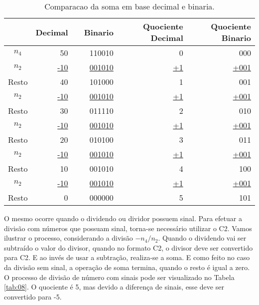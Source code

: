 \documentclass[12pt]{article}
\begin{document}
\begin{table}[ht]
	\centering
    \caption{Comparacao da soma em base decimal e binaria.}
    \begin{tabular}{crrrrr}
    \hline
    	  & Decimal & & Binario & Quociente Decimal & Quociente Binario \\
    \hline  
    $n_4$ & 50 					& & 110010
&0& 000 \\
    $n_2$ & \underline{-10} 	& & \underline{001010}  &\underline{+1}&
\underline{+001} \\
    Resto & 40      			& & 101000  			&1& 001
\\
    $n_2$ & \underline{-10} 	& & \underline{001010}  &\underline{+1}&
\underline{+001} \\
    Resto & 30      			& & 011110  			&2& 010
\\
    $n_2$ & \underline{-10} 	& & \underline{001010}  &\underline{+1}&
\underline{+001} \\
    Resto & 20      			& & 010100  			&3& 011
\\
    $n_2$ & \underline{-10} 	& & \underline{001010}  &\underline{+1}&
\underline{+001} \\
    Resto & 10      			& & 001010  			&4& 100
\\
    $n_2$ & \underline{-10} 	& & \underline{001010}  &\underline{+1}&
\underline{+001} \\
    Resto & 0      				& & 000000
&5& 101 \\
    \hline
	\end{tabular}
    \label{tab:07}
\end{table}

O mesmo ocorre quando o dividendo ou dividor possuem sinal. Para efetuar a
divisão com números que possuam sinal, torna-se necessário utilizar o C2. Vamos
ilustrar o processo, considerando a divisão $-n_4 / n_2$. Quando o dividendo vai
ser subtraído o valor do divisor, quando no formato C2, o divisor deve ser
convertido para C2. E ao invés de usar a subtração, realiza-se a soma. E como
feito no caso da divisão sem sinal, a operação de soma termina, quando o resto é
igual a zero. O processo de divisão de número com sinais pode ser visualizado no
Tabela \ref{tab:08}. O quociente é 5, mas devido a diferença de sinais, esse
deve ser convertido para -5.
\end{document}
